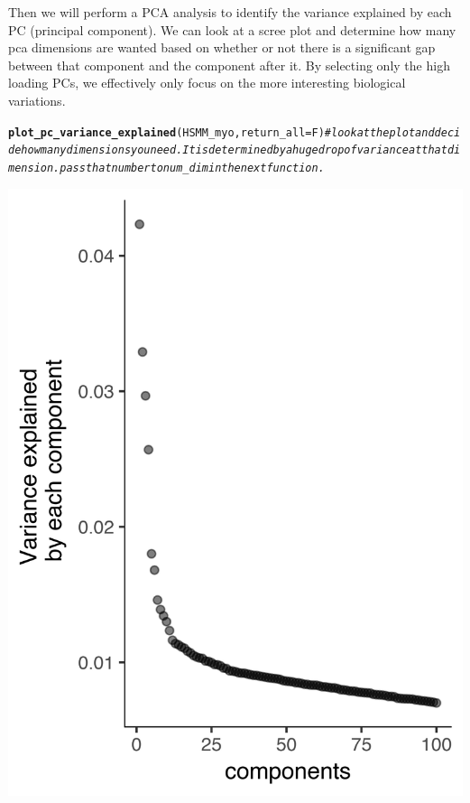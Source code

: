 \documentclass[10pt,oneside]{article}\usepackage[]{graphicx}\usepackage[]{color}
\makeatletter
\def\maxwidth{ %
  \ifdim\Gin@nat@width>\linewidth
    \linewidth
  \else
    \Gin@nat@width
  \fi
}
\newcommand{\hlcom}[1]{\textcolor[rgb]{0.678,0.584,0.686}{\textit{#1}}}%
\newcommand{\hlstd}[1]{\textcolor[rgb]{0.345,0.345,0.345}{#1}}%
\newcommand{\hlkwc}[1]{\textcolor[rgb]{0.333,0.667,0.333}{#1}}%
\newcommand{\hlkwd}[1]{\textcolor[rgb]{0.737,0.353,0.396}{\textbf{#1}}}%
\newenvironment{kframe}{%
 \def\at@end@of@kframe{}%
 \ifinner\ifhmode%
  \def\at@end@of@kframe{\end{minipage}}%
  \begin{minipage}{\columnwidth}%
 \fi\fi%
 \def\FrameCommand##1{\hskip\@totalleftmargin \hskip-\fboxsep
 \colorbox{shadecolor}{##1}\hskip-\fboxsep
     \hskip-\linewidth \hskip-\@totalleftmargin \hskip\columnwidth}%
 \MakeFramed {\advance\hsize-\width
   \@totalleftmargin\z@ \linewidth\hsize
   \@setminipage}}%
 {\par\unskip\endMakeFramed%
 \at@end@of@kframe}
\newenvironment{knitrout}{}{} %
\makeatother
\begin{document}
Then we will perform a PCA analysis to identify the variance explained by each PC (principal component). 
We can look at a scree plot and determine how many pca dimensions are wanted based on whether or not there is a 
significant gap between that component and the component after it. By selecting only the high loading PCs, 
we effectively only focus on the more interesting biological variations.  
\begin{knitrout}
\color{fgcolor}\begin{kframe}
\begin{alltt}
\hlkwd{plot_pc_variance_explained}\hlstd{(HSMM_myo,} \hlkwc{return_all} \hlstd{= F)} \hlcom{#look at the plot and decide how many dimensions you need. It is determined by a huge drop of variance at that dimension. pass that number to num_dim in the next function.}
\end{alltt}
\end{kframe}

{\centering \includegraphics[width=\maxwidth]{figure/plot_pc_variance-1} 

}



\end{knitrout}
\end{document}
